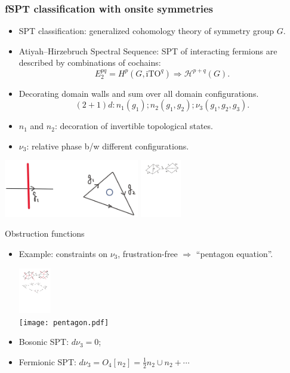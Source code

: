 \documentclass[xcolor=table, 11pt, aspectratio=169]{beamer}
\begin{document}
\begin{frame}
  \frametitle{fSPT classification with onsite symmetries}
  \begin{itemize}
    \item SPT classification: generalized cohomology theory of symmetry group $G$.
    \item Atiyah–Hirzebruch Spectral Sequence: SPT of interacting fermions are described by combinations of cochains:
      \[E^{pq}_2=H^p(G, \text{iTO}^q)\Rightarrow
      \mathcal H^{p+q}(G).\]
    \item Decorating domain walls and sum over all domain configurations.
      \[(2+1)d: n_1(g_1); n_2(g_1, g_2); \nu_3(g_1,g_2,g_3).\]
    \item $n_1$ and $n_2$: decoration of invertible topological states.
    \item $\nu_3$: relative phase b/w different configurations.
  \end{itemize}
  \begin{center}
    \includegraphics[height=2.5cm]{fspt_decor.jpg}
    \includegraphics[height=2.5cm]{fmove.pdf}
  \end{center}
\end{frame}

\begin{frame}{Obstruction functions}
  \begin{itemize}
    \item Example: constraints on $\nu_3$, frustration-free $\Rightarrow$ ``pentagon equation''.
    \begin{center}
      \includegraphics[height=2cm]{fmove2.pdf}\\
      \texttt{[image: pentagon.pdf]}        
    \end{center}
    \item Bosonic SPT: $d\nu_3=0$;
    \item Fermionic SPT: $d\nu_3=O_4[n_2]=\frac12 n_2\cup n_2 + \cdots$
  \end{itemize}
\end{frame}
\end{document}
